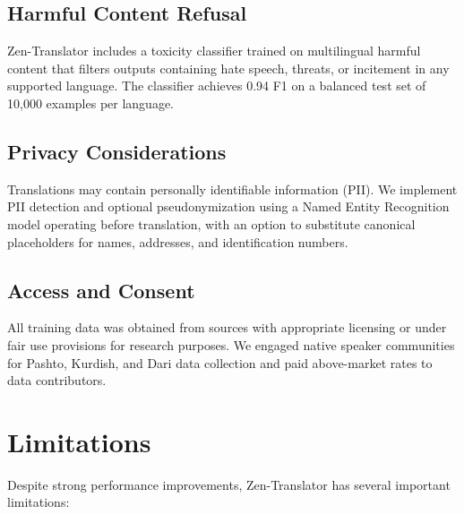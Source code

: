 \documentclass[11pt,twocolumn]{article}
\begin{document}
\subsection{Harmful Content Refusal}

Zen-Translator includes a toxicity classifier trained on multilingual
harmful content that filters outputs containing hate speech, threats, or
incitement in any supported language. The classifier achieves 0.94 F1
on a balanced test set of 10,000 examples per language.

\subsection{Privacy Considerations}

Translations may contain personally identifiable information (PII).
We implement PII detection and optional pseudonymization using a Named
Entity Recognition model operating before translation, with an option
to substitute canonical placeholders for names, addresses, and
identification numbers.

\subsection{Access and Consent}

All training data was obtained from sources with appropriate licensing
or under fair use provisions for research purposes. We engaged native
speaker communities for Pashto, Kurdish, and Dari data collection and
paid above-market rates to data contributors.

\section{Limitations}
\label{sec:limitations}

Despite strong performance improvements, Zen-Translator has several
important limitations:
\end{document}
